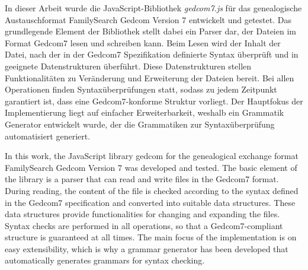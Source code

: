 \kurzfassung
In dieser Arbeit wurde die JavaScript-Bibliothek \textit{gedcom7.js} für das genealogische Austauschformat FamilySearch Gedcom Version 7 entwickelt und getestet. Das grundlegende Element der Bibliothek stellt dabei ein Parser dar, der Dateien im Format Gedcom7 lesen und schreiben kann. Beim Lesen wird der Inhalt der Datei, nach der in der Gedcom7 Spezifikation definierte Syntax überprüft und in geeignete Datenstrukturen überführt. Diese Datenstrukturen stellen Funktionalitäten zu Veränderung und Erweiterung der Dateien bereit. Bei allen Operationen finden Syntaxüberprüfungen statt, sodass zu jedem Zeitpunkt garantiert ist, dass eine Gedcom7-konforme Struktur vorliegt. Der Hauptfokus der Implementierung liegt auf einfacher Erweiterbarkeit, weshalb ein Grammatik Generator entwickelt wurde, der die Grammatiken zur Syntaxüberprüfung automatisiert generiert.

\kurzfassungEN
In this work, the JavaScript library  gedcom for the genealogical exchange format FamilySearch Gedcom Version 7 was developed and tested. The basic element of the library is a parser that can read and write files in the Gedcom7 format. During reading, the content of the file is checked according to the syntax defined in the Gedcom7 specification and converted into suitable data structures. These data structures provide functionalities for changing and expanding the files. Syntax checks are performed in all operations, so that a Gedcom7-compliant structure is guaranteed at all times. The main focus of the implementation is on easy extensibility, which is why a grammar generator has been developed that automatically generates grammars for syntax checking.
